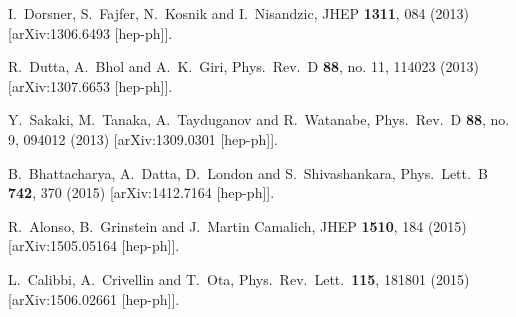 \documentclass[prd,preprint,superscriptaddress,amsmath,amssymb]{revtex4}
\begin{document}
\begin{thebibliography}{100}
  I.~Dorsner, S.~Fajfer, N.~Kosnik and I.~Nisandzic,
  JHEP {\bf 1311}, 084 (2013)
  [arXiv:1306.6493 [hep-ph]].
  
  R.~Dutta, A.~Bhol and A.~K.~Giri,
  Phys.\ Rev.\ D {\bf 88}, no. 11, 114023 (2013)
  [arXiv:1307.6653 [hep-ph]].
  
  Y.~Sakaki, M.~Tanaka, A.~Tayduganov and R.~Watanabe,
  Phys.\ Rev.\ D {\bf 88}, no. 9, 094012 (2013)
  [arXiv:1309.0301 [hep-ph]].
  
  B.~Bhattacharya, A.~Datta, D.~London and S.~Shivashankara,
  Phys.\ Lett.\ B {\bf 742}, 370 (2015)
  [arXiv:1412.7164 [hep-ph]].


  R.~Alonso, B.~Grinstein and J.~Martin Camalich,
  JHEP {\bf 1510}, 184 (2015)
  [arXiv:1505.05164 [hep-ph]].
 
  L.~Calibbi, A.~Crivellin and T.~Ota,
  Phys.\ Rev.\ Lett.\  {\bf 115}, 181801 (2015)
  [arXiv:1506.02661 [hep-ph]].
 

\end{thebibliography}
\end{document}
